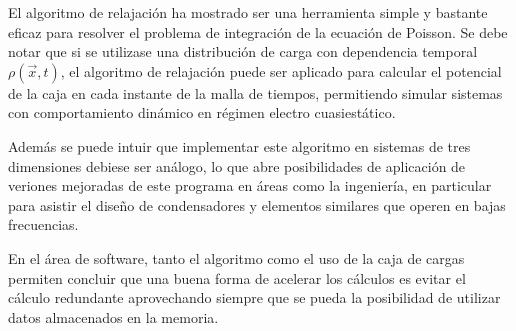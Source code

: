 \documentclass{article}
\begin{document}
El algoritmo de relajación ha mostrado ser una herramienta simple y bastante eficaz para resolver el problema de integración de la ecuación de Poisson. Se debe notar que si se utilizase una distribución de carga con dependencia temporal $\rho(\vec{x}, t)$, el algoritmo de relajación puede ser aplicado para calcular el potencial de la caja en cada instante de la malla de tiempos, permitiendo simular sistemas con comportamiento dinámico en régimen electro cuasiestático.

Además se puede intuir que implementar este algoritmo en sistemas de tres dimensiones debiese ser análogo, lo que abre posibilidades de aplicación de veriones mejoradas de este programa en áreas como la ingeniería, en particular para asistir el diseño de condensadores y elementos similares que operen en bajas frecuencias.

En el área de software, tanto el algoritmo como el uso de la caja de cargas permiten concluir que una buena forma de acelerar los cálculos es evitar el cálculo redundante aprovechando siempre que se pueda la posibilidad de utilizar datos almacenados en la memoria.
\end{document}
